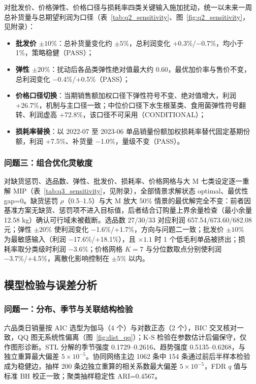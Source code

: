 对批发价、价格弹性、价格口径与损耗率四类关键输入施加扰动，统一以未来一周总补货量与总期望利润为口径（表~\ref{tab:q2_sensitivity}、图~\ref{fig:q2_sensitivity}，见附录）：

\begin{itemize}
    \item \textbf{批发价 $\pm10\%$}：总补货量变化约 $\pm5\%$，总利润变化 +0.3\%/−0.7\%，均小于 1\%，策略稳健（PASS）；
    \item \textbf{弹性 $\pm20\%$}：扰动后各品类弹性绝对值最大约 0.60，最优加价率与售价不变，总利润变化 −0.4\%/+0.5\%（PASS）；
    \item \textbf{价格口径切换}：当期销售额加权口径下弹性符号不变、绝对值增大，利润 +26.7\%，机制与主口径一致；中位价口径下水生根茎类、食用菌弹性符号翻转、利润虚高 +72.8\%，该口径不可采用（CONDITIONAL）；
    \item \textbf{损耗率替换}：以 2022-07 至 2023-06 单品销量份额加权损耗率替代固定基期份额，利润 +7.5\%、补货量 −1.0\%，量级不变（PASS）。
\end{itemize}

\subsubsection{问题三：组合优化灵敏度}

对缺货惩罚、选品数、弹性、批发价、损耗率、价格网格与大 M 七类设定逐一重解 MIP（表~\ref{tab:q3_sensitivity}，见附录），全部情景求解状态 optimal、最优性 gap=0。缺货惩罚 $\rho$（0.5--1.5）与大 M 放大 50\% 情景的最优解完全不变：前者因基准方案无缺货、惩罚项不进入目标值，后者结合订购量上界余量检查（最小余量 12.58 kg）确认可行域未被截断。选品数 27/30/33 对应利润 657.54/673.60/682.08 元；弹性 $\pm20\%$ 使利润变化 −1.6\%/+1.7\%，方向与问题二一致；批发价 $\pm10\%$ 为最敏感输入（利润 −17.6\%/+18.1\%），且 $\times1.1$ 时 1 个低毛利单品被挤出；损耗率取分类级时利润 −3.6\%；价格网格 $K=7$ 与分位数取点分别使利润 −3.7\%/+4.5\%，离散化影响控制在 $\pm5\%$ 以内。

\subsection{模型检验与误差分析}

\subsubsection{问题一：分布、季节与关联结构检验}

六品类日销量按 AIC 选型为伽马（4 个）与对数正态（2 个），BIC 交叉核对一致，QQ 图无系统性偏离（图~\ref{fig:dist_qq}）；K-S 检验在参数估计后偏保守，仅作图形诊断。STL 分解的季节强度 0.1729--0.2616、趋势强度 0.5135--0.6268，与独立重算最大偏差 $5\times10^{-5}$。协同网络主边 1062 条中 154 条通过前后半样本检验成为稳健边，抽样 200 条边独立重算的相关系数最大偏差 $5\times10^{-5}$，FDR $q$ 值与标准 BH 校正一致；聚类抽样稳定性 ARI=0.4567。

